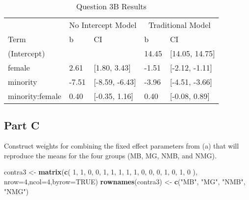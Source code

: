 \documentclass[]{article}
\newenvironment{Shaded}{\begin{snugshade}}{\end{snugshade}}
\newcommand{\KeywordTok}[1]{\textcolor[rgb]{0.13,0.29,0.53}{\textbf{#1}}}
\newcommand{\DataTypeTok}[1]{\textcolor[rgb]{0.13,0.29,0.53}{#1}}
\newcommand{\DecValTok}[1]{\textcolor[rgb]{0.00,0.00,0.81}{#1}}
\newcommand{\StringTok}[1]{\textcolor[rgb]{0.31,0.60,0.02}{#1}}
\newcommand{\OtherTok}[1]{\textcolor[rgb]{0.56,0.35,0.01}{#1}}
\newcommand{\NormalTok}[1]{#1}
\begin{document}
\begin{table}

\caption{\label{tab:unnamed-chunk-10}Question 3B Results}
\centering
\begin{tabular}[t]{lllll}
\toprule
\multicolumn{1}{c}{ } & \multicolumn{2}{c}{No Intercept Model} & \multicolumn{2}{c}{Traditional Model} \\
\cmidrule(l{2pt}r{2pt}){2-3} \cmidrule(l{2pt}r{2pt}){4-5}
Term & b & CI & b & CI\\
\midrule
(Intercept) &  &  & 14.45 & [14.05, 14.75]\\
female & 2.61 & [1.80, 3.43] & -1.51 & [-2.12, -1.11]\\
minority & -7.51 & [-8.59, -6.43] & -3.96 & [-4.51, -3.66]\\
minority:female & 0.40 & [-0.35, 1.16] & 0.40 & [-0.08, 0.89]\\
\bottomrule
\end{tabular}
\end{table}

\subsection{Part C}\label{part-c-1}

Construct weights for combining the fixed effect parameters from (a)
that will reproduce the means for the four groups (MB, MG, NMB, and
NMG).

\begin{Shaded}
\begin{Highlighting}[]
\NormalTok{contra3 <-}\StringTok{ }\KeywordTok{matrix}\NormalTok{(}\KeywordTok{c}\NormalTok{(}
  \DecValTok{1}\NormalTok{, }\DecValTok{1}\NormalTok{, }\DecValTok{0}\NormalTok{, }\DecValTok{0}\NormalTok{,}
  \DecValTok{1}\NormalTok{, }\DecValTok{1}\NormalTok{, }\DecValTok{1}\NormalTok{, }\DecValTok{1}\NormalTok{,}
  \DecValTok{1}\NormalTok{, }\DecValTok{0}\NormalTok{, }\DecValTok{0}\NormalTok{, }\DecValTok{0}\NormalTok{,}
  \DecValTok{1}\NormalTok{, }\DecValTok{0}\NormalTok{, }\DecValTok{1}\NormalTok{, }\DecValTok{0}
\NormalTok{), }\DataTypeTok{nrow=}\DecValTok{4}\NormalTok{,}\DataTypeTok{ncol=}\DecValTok{4}\NormalTok{,}\DataTypeTok{byrow=}\OtherTok{TRUE}\NormalTok{)}
\KeywordTok{rownames}\NormalTok{(contra3) <-}\StringTok{ }\KeywordTok{c}\NormalTok{(}\StringTok{"MB"}\NormalTok{, }\StringTok{"MG"}\NormalTok{, }\StringTok{"NMB"}\NormalTok{, }\StringTok{"NMG"}\NormalTok{)}
\end{Highlighting}
\end{Shaded}
\end{document}
